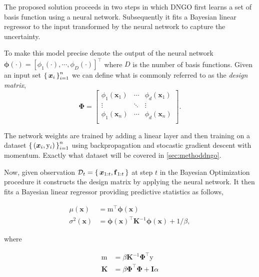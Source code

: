 \documentclass[conference,compsoc]{IEEEtran}
\theoremstyle{definition}
\begin{document}
        The proposed solution proceeds in two steps in which DNGO first learns a set of basis function using a neural network. 
        Subsequently it fits a Bayesian linear regressor to the input transformed by the neural network to capture the uncertainty.

        To make this model precise denote the output of the neural network $\bm{\phi}(\cdot) = [\phi_1(\cdot), \cdots, \phi_D(\cdot)]^\top$ where $D$ is the number of basis functions.
        Given an input set $\set{\bm{x}_i}_{i=1}^n$ we can define what is commonly referred to as the \emph{design matrix},
        \begin{equation}
            \bm{\Phi} = \begin{bmatrix}
            \phi_1(\bm{x}_1) & \cdots & \phi_d(\bm{x}_1) \\
            \vdots & \ddots & \vdots \\
            \phi_1(\bm{x}_n) & \cdots & \phi_d(\bm{x}_n) \\
        \end{bmatrix}.
        \end{equation}

        The network weights are trained by adding a linear layer and then training on a dataset $\set{(\bm{x}_i, \mathrm{y}_i)}_{i=1}^n$ using backpropagation and stocastic gradient descent with momentum.
        Exactly what dataset will be covered in \cref{sec:methoddngo}.

        Now, given observation $\mathcal{D}_t = \set{\bm{x}_{1:t},\bm{\mathrm{f}}_{1:t}}$ at step $t$ in the Bayesian Optimization procedure it constructs the design matrix by applying the neural network.
        It then fits a Bayesian linear regressor providing predictive statistics as follows,

            \begin{align}
                \mu(\bm{x}) &= \bm{\mathrm{m}}^\top \bm{\phi}(\bm{x})\\ %
                \sigma^2(\bm{x}) &= \bm{\phi}(\bm{x})^\top \bm{K}^{-1} \bm{\phi}(\bm{x}) + 1/\beta,
            \end{align}

        where 

            \begin{align}
                \bm{\mathrm{m}} & = \beta \bm{K}^{-1} \bm{\Phi}^\top \bm{\mathrm{y}}\\
                \bm{K} & = \beta \bm{\Phi}^\top \bm{\Phi} + \bm{I} \alpha
            \end{align}
            
\end{document}
